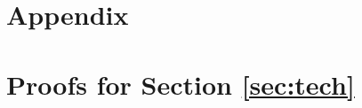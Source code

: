 \documentclass[11pt]{article}
\theoremstyle{definition}
\theoremstyle{plain}
\begin{document}
\newpage
\begin{appendices}
\section*{Appendix}
%

\section{Proofs for Section \ref{sec:tech}}\label{app:tech-proofs}


\end{appendices}
\end{document}

